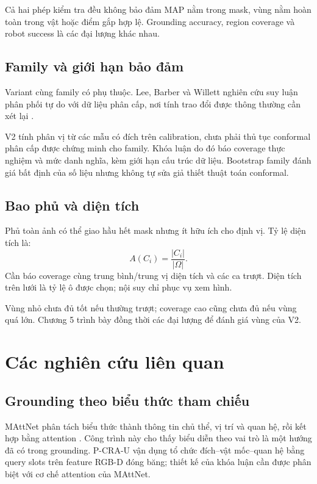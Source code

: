 Cả hai phép kiểm tra đều không bảo đảm MAP nằm trong mask, vùng nằm hoàn toàn trong vật hoặc điểm gắp hợp lệ. Grounding accuracy, region coverage và robot success là các đại lượng khác nhau.

\subsection{Family và giới hạn bảo đảm}

Variant cùng family có phụ thuộc. Lee, Barber và Willett nghiên cứu suy luận phân phối tự do với dữ liệu phân cấp, nơi tính trao đổi được thông thường cần xét lại \cite{lee2023hierarchical}.

V2 tính phân vị từ các mẫu có đích trên calibration, chưa phải thủ tục conformal phân cấp được chứng minh cho family. Khóa luận do đó báo coverage thực nghiệm và mức danh nghĩa, kèm giới hạn cấu trúc dữ liệu. Bootstrap family đánh giá bất định của số liệu nhưng không tự sửa giả thiết thuật toán conformal.

\subsection{Bao phủ và diện tích}

Phủ toàn ảnh có thể giao hầu hết mask nhưng ít hữu ích cho định vị. Tỷ lệ diện tích là:
\begin{equation}
    A(C_i)=\frac{|C_i|}{|\Omega|}.
    \label{eq:theory-region-area}
\end{equation}
Cần báo coverage cùng trung bình/trung vị diện tích và các ca trượt. Diện tích trên lưới là tỷ lệ ô được chọn; nội suy chỉ phục vụ xem hình.

Vùng nhỏ chưa đủ tốt nếu thường trượt; coverage cao cũng chưa đủ nếu vùng quá lớn. Chương 5 trình bày đồng thời các đại lượng để đánh giá vùng của V2.

\section{Các nghiên cứu liên quan}
\label{sec:theory-related-work}

\subsection{Grounding theo biểu thức tham chiếu}

MAttNet phân tách biểu thức thành thông tin chủ thể, vị trí và quan hệ, rồi kết hợp bằng attention \cite{yu2018mattnet}. Công trình này cho thấy biểu diễn theo vai trò là một hướng đã có trong grounding. P-CRA-U vận dụng tổ chức đích--vật mốc--quan hệ bằng query slots trên feature RGB-D đóng băng; thiết kế của khóa luận cần được phân biệt với cơ chế attention của MAttNet.

